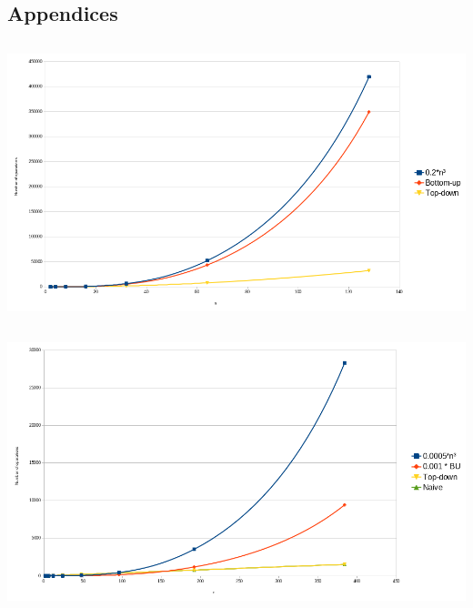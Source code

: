 \documentclass[twocolumn]{article}
\begin{document}
\newpage
\onecolumn
\setcounter{section}{0}
\subsection*{Appendices}

\subsection{ }
\begin{center}
  \label{fig:plr}
  \includegraphics[width=\textwidth]{paren/complexity_paren_lefts_rights}
\end{center}

\newpage
\subsection{ }
\begin{center}
  \label{fig:plr2}
  \includegraphics[width=\textwidth]{paren/complexity_paren_left_right}
\end{center}

\newpage
\end{document}
